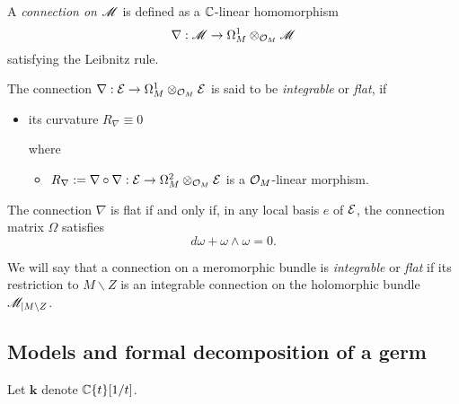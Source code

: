 \begin{defn}
  A \emph{connection on $\mathscr{M}$} is defined as a $\mathbb{C}$-linear homomorphism
  \[
    \nabla:\mathscr{M}\to\Omega_M^1\otimes_{\mathcal{O}_M}\mathscr{M}
  \]
  satisfying the Leibnitz rule.
\end{defn}
\begin{defn}[Flatness (0.12.2)]
  The connection $\nabla:\mathcal{E}\to \Omega_M^1\otimes_{\mathcal{O}_M}\mathcal{E}$ is said to be
  \emph{integrable} or \emph{flat}, if
  \begin{itemize}
    \item its curvature $R_\nabla\equiv0$

    where
    \begin{itemize}
      \item $R_\nabla:=\nabla\circ\nabla:\mathcal{E}\to\Omega_M^2\otimes_{\mathcal{O}_M}\mathcal{E}$
        is a $\mathcal{O}_M$-linear morphism.
    \end{itemize}
  \end{itemize}
  \begin{prop}[0.12.4]
    The connection $\nabla$ is flat if and only if, in any local basis $e$ of
    $\mathcal{E}$, the connection matrix $\Omega$ satisfies
    \[
      d\omega + \omega \wedge \omega = 0.
    \]
  \end{prop}
  We will say that a connection on a meromorphic bundle is \emph{integrable} or
  \emph{flat} if its restriction to $M\backslash Z$ is an integrable connection
  on the holomorphic bundle $\mathscr{M}_{|M\backslash Z}$.
\end{defn}

\subsection{Models and formal decomposition of a germ}
Let $\textbf{k}$ denote $\mathbb{C}\{t\}[1/t]$.
